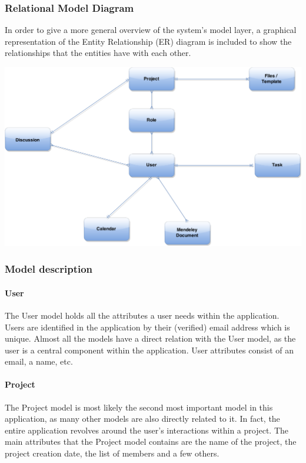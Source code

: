 \subsubsection{Relational Model Diagram}

In order to give a more general overview of the system's model layer, a graphical representation of the Entity Relationship (ER) diagram is included to
show the relationships that the entities have with each other.

\begin{center}
\includegraphics[scale=0.3]{./img/dsgn_img/RMA.png}
	
\end{center}

\subsubsection{Model description}
\paragraph{User}
The User model holds all the attributes a user needs within the application. Users are identified in the application by their (verified) email address 
which is unique. Almost all the models have a direct relation with the User model, as the user is a central component within the application. User 
attributes consist of an email, a name, etc.

\paragraph{Project}

The Project model is most likely the second most important model in this application, as many other models are also directly related to it. In fact, 
the entire application revolves around the user's interactions within a project. The main attributes that the Project model contains are the name of 
the project, the project creation date, the list of members and a few others.

